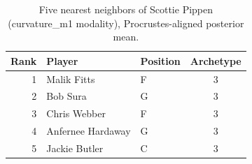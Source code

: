 \begin{table}[htbp]
  \centering\small
  \begin{tabular}{rllc}
    \toprule
    Rank & Player & Position & Archetype \\
    \midrule
    1 & Malik Fitts & F & 3 \\
    2 & Bob Sura & G & 3 \\
    3 & Chris Webber & F & 3 \\
    4 & Anfernee Hardaway & G & 3 \\
    5 & Jackie Butler & C & 3 \\
    \bottomrule
  \end{tabular}
  \caption{Five nearest neighbors of Scottie Pippen (curvature_m1 modality), Procrustes-aligned posterior mean.}
  \label{tab:Scottie_Pippen_neighbors_curvature_m1}
\end{table}

